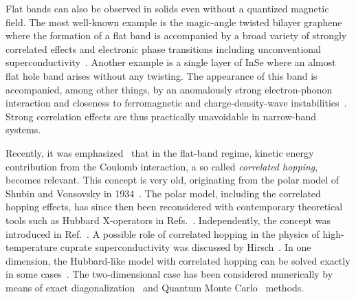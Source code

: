 Flat bands can also be observed in solids even without a quantized magnetic field. The most well-known example is the magic-angle twisted bilayer graphene~\cite{suarez_morell_flat_2010,bistritzer_moire_2011,li_observation_2010} where the formation of a flat band is accompanied by a broad variety of strongly correlated effects and electronic phase transitions including unconventional superconductivity~\cite{cao_correlated_2018,cao_unconventional_2018,yankowitz_tuning_2019,sharpe_emergent_2019}. Another example is a single layer of InSe where an almost flat hole band arises without any twisting. The appearance of this band is accompanied, among other things, by an anomalously strong electron-phonon interaction and closeness to ferromagnetic and charge-density-wave instabilities~\cite{InSe1,InSe2}. Strong correlation effects are thus practically unavoidable in narrow-band systems.

Recently, it was emphasized~\cite{cea2021electrostatic} that in the flat-band regime, kinetic energy contribution from the Coulomb interaction, a so called \emph{correlated hopping}, becomes relevant.
This concept is very old, originating from the polar model of Shubin and Vonsovsky in 1934~\cite{schubin1934electron}. The polar model, including the correlated hopping effects, has since then been reconsidered with contemporary theoretical tools such as Hubbard X-operators in Refs.~\cite{vonsovsky1979some1,vonsovsky1979some2}. Independently, the concept was introduced in Ref.~\cite{foglio1979new}. A possible role of correlated hopping in the physics of high-temperature cuprate superconductivity was discussed by Hirsch~\cite{hirsch1989hole,hirsch1989bond}. In one dimension, the Hubbard-like model with correlated hopping can be solved exactly in some cases~\cite{arrachea1996anomalous,aligia2000phase}. The two-dimensional case has been considered numerically by means of exact diagonalization~\cite{gagliano1995single,arrachea2000pairing} and Quantum Monte Carlo~\cite{di2014quantum} methods. 

